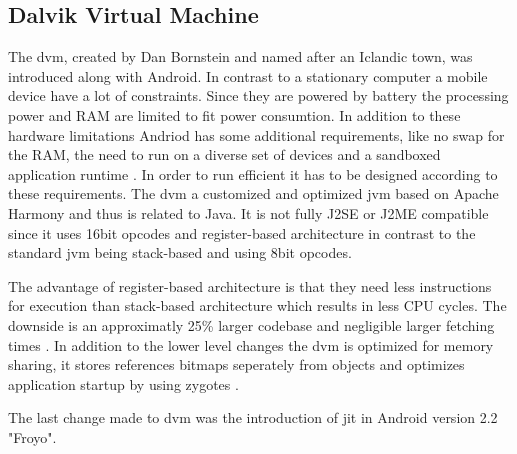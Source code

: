 \subsection{Dalvik Virtual Machine} \label{subsection:android-dalvik}
The \gls{dvm}, created by Dan Bornstein and named after an Iclandic town, was introduced along with Android.
\newline
In contrast to a stationary computer a mobile device have a lot of constraints.
Since they are powered by battery the processing power and RAM are limited to fit power consumtion.
In addition to these hardware limitations Andriod has some additional requirements, like no swap for the RAM, the need to run on a diverse set of devices and a sandboxed application runtime .
In order to run efficient it has to be designed according to these requirements.
The \gls{dvm} a customized and optimized \gls{jvm} based on Apache Harmony and thus is related to Java.
It is not fully J2SE or J2ME compatible since it uses 16bit opcodes and register-based architecture in contrast to the standard \gls{jvm} being stack-based and using 8bit opcodes.

The advantage of register-based architecture is that they need less instructions for execution than stack-based architecture which results in less CPU cycles.
The downside is an approximatly 25\% larger codebase and negligible larger fetching times \cite{ehringerDalvik}.
In addition to the lower level changes the \gls{dvm} is optimized for memory sharing, it stores references bitmaps seperately from objects and optimizes application startup by using zygotes \cite{andevconDalvikART}.
\newline

The last change made to \gls{dvm} was the introduction of \gls{jit} in Android version 2.2 "Froyo".




